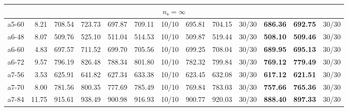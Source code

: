 \documentclass[aspectratio=1610]{beamer}
\begin{document}
\begin{frame}
\begin{table}[]
{\begin{tabular}{lrrrrrrrrrrrr}
\multicolumn{13}{c}{$n_\mathrm{s} = \infty$}                                                                                                                                                                                                                                                                                     \\ \hline
a5-60                                          & 8.21                                                         & 708.54  & \multicolumn{1}{r|}{723.73}   & 697.87  & 709.11   & \multicolumn{1}{r|}{10/10} & 695.81  & 704.15   & \multicolumn{1}{r|}{30/30} & \textbf{686.36}  & {\color[HTML]{FE0000} \textbf{692.75}}  & 30/30 \\
a6-48                                          & 8.07                                                         & 509.76  & \multicolumn{1}{r|}{525.10}   & 511.04  & 514.53   & \multicolumn{1}{r|}{10/10} & 509.87  & 519.44   & \multicolumn{1}{r|}{30/30} & \textbf{508.10}  & {\color[HTML]{FE0000} \textbf{509.46}}  & 30/30 \\
a6-60                                          & 4.83                                                         & 697.57  & \multicolumn{1}{r|}{711.52}   & 699.70  & 705.56   & \multicolumn{1}{r|}{10/10} & 699.25  & 708.04   & \multicolumn{1}{r|}{30/30} & \textbf{689.95}  & {\color[HTML]{FE0000} \textbf{695.13}}  & 30/30 \\
a6-72                                          & 9.57                                                         & 796.19  & \multicolumn{1}{r|}{826.48}   & 788.34  & 801.80   & \multicolumn{1}{r|}{10/10} & 782.32  & 799.84   & \multicolumn{1}{r|}{30/30} & \textbf{769.12}  & {\color[HTML]{FE0000} \textbf{779.49}}  & 30/30 \\
a7-56                                          & 3.53                                                         & 625.91  & \multicolumn{1}{r|}{641.82}   & 627.34  & 633.38   & \multicolumn{1}{r|}{10/10} & 623.45  & 632.08   & \multicolumn{1}{r|}{30/30} & \textbf{617.12}  & {\color[HTML]{FE0000} \textbf{621.51}}  & 30/30 \\
a7-70                                          & 8.00                                                         & 781.56  & \multicolumn{1}{r|}{800.35}   & 777.69  & 785.49   & \multicolumn{1}{r|}{10/10} & 769.84  & 783.03   & \multicolumn{1}{r|}{30/30} & \textbf{757.66}  & {\color[HTML]{FE0000} \textbf{765.36}}  & 30/30 \\
a7-84                                          & 11.75                                                        & 915.61  & \multicolumn{1}{r|}{938.49}   & 900.98  & 916.93   & \multicolumn{1}{r|}{10/10} & 900.77  & 920.03   & \multicolumn{1}{r|}{30/30} & \textbf{888.40}  & {\color[HTML]{FE0000} \textbf{897.33}}  & 30/30 \\

\end{tabular}}
\end{table}
\end{frame}
\end{document}

